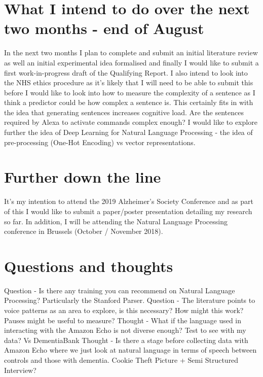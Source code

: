 \documentclass[a4paper]{article}
\begin{document}
\section{What I intend to do over the next two months - end of August}
In the next two months I plan to complete and submit an initial literature review as well an initial experimental idea formalised and finally I would like to submit a first work-in-progress draft of the Qualifying Report. I also intend to look into the NHS ethics procedure as it's likely that I will need to be able to submit this before
\newline
I would like to look into how to measure the complexity of a sentence as I think a predictor could be how complex a sentence is. This certainly fits in with the idea that generating sentences increases cognitive load. Are the sentences required by Alexa to activate commands complex enough?
\newline
I would like to explore further the idea of Deep Learning for Natural Language Processing - the idea of pre-processing (One-Hot Encoding) vs vector representations.
\section{Further down the line}
It's my intention to attend the 2019 Alzheimer's Society Conference and as part of this I would like to submit a paper/poster presentation detailing my research so far. In addition, I will be attending the Natural Language Processing conference in Brussels (October / November 2018).

\section{Questions and thoughts}
Question - Is there any training you can recommend on Natural Language Processing? Particularly the Stanford Parser.
\newline
Question - The literature points to voice patterns as an area to explore, is this necessary? How might this work? Pauses might be useful to measure?
\newline
Thought - What if the language used in interacting with the Amazon Echo is not diverse enough? Test to see with my data? Vs DementiaBank
\newline
Thought - Is there a stage before collecting data with Amazon Echo where we just look at natural language in terms of speech between controls and those with dementia. Cookie Theft Picture + Semi Structured Interview?
\end{document}
